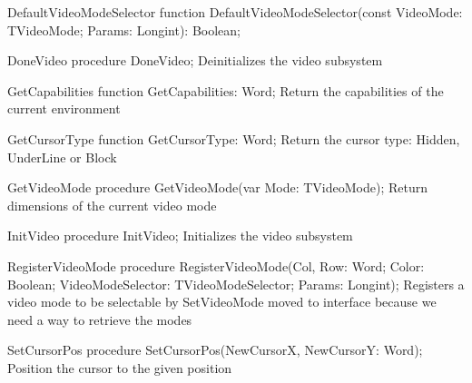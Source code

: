 \begin{procedure}{DefaultVideoModeSelector}
\Declaration
function  DefaultVideoModeSelector(const VideoMode: TVideoMode; Params: Longint): Boolean;
\Description
\Errors
\SeeAlso
\end{procedure}

\begin{procedure}{DoneVideo}
\Declaration
procedure DoneVideo; 
\Description
{ Deinitializes the video subsystem }
\Errors
\SeeAlso
\end{procedure}

\begin{function}{GetCapabilities}
\Declaration
function  GetCapabilities: Word; 
\Description
{ Return the capabilities of the current environment }
\Errors
\SeeAlso
\end{function}

\begin{function}{GetCursorType}
\Declaration
function GetCursorType: Word; 
\Description
{ Return the cursor type: Hidden, UnderLine or Block }
\Errors
\SeeAlso
\end{function}

\begin{procedure}{GetVideoMode}
\Declaration
procedure GetVideoMode(var Mode: TVideoMode); 
\Description
{ Return dimensions of the current video mode }
\Errors
\SeeAlso
\end{procedure}

\begin{procedure}{InitVideo}
\Declaration
procedure InitVideo; 
\Description
{ Initializes the video subsystem }
\Errors
\SeeAlso
\end{procedure}

\begin{procedure}{RegisterVideoMode}
\Declaration
procedure RegisterVideoMode(Col, Row: Word; Color: Boolean; VideoModeSelector: TVideoModeSelector; Params: Longint); 
\Description
{ Registers a video mode to be selectable by SetVideoMode } 
{ moved to interface because we need a way to retrieve the modes }
\Errors
\SeeAlso
\end{procedure}

\begin{procedure}{SetCursorPos}
\Declaration
procedure SetCursorPos(NewCursorX, NewCursorY: Word); 
\Description
{ Position the cursor to the given position }
\Errors
\SeeAlso
\end{procedure}

